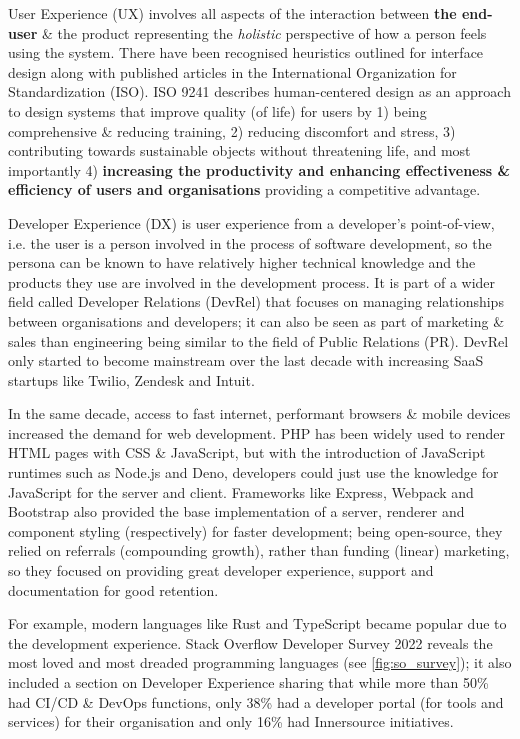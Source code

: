 User Experience (UX) involves all aspects of the interaction between \textbf{the end-user} \& the product representing the \textit{holistic} perspective of how a person feels using the system. There have been recognised heuristics outlined for interface design along with published articles in the International Organization for Standardization (ISO). ISO 9241 describes human-centered design as an approach to design systems that improve quality (of life) for users by 1) being comprehensive \& reducing training, 2) reducing discomfort and stress, 3) contributing towards sustainable objects without threatening life, and most importantly 4) \textbf{increasing the productivity and enhancing effectiveness \& efficiency of users and organisations} providing a competitive advantage.

Developer Experience (DX) is user experience from a developer's point-of-view, i.e. the user is a person involved in the process of software development, so the persona can be known to have relatively higher technical knowledge and the products they use are involved in the development process. It is part of a wider field called Developer Relations (DevRel) that focuses on managing relationships between organisations and developers; it can also be seen as part of marketing \& sales than engineering being similar to the field of Public Relations (PR). DevRel only started to become mainstream over the last decade with increasing SaaS startups like Twilio, Zendesk and Intuit.

In the same decade, access to fast internet, performant browsers \& mobile devices increased the demand for web development. PHP has been widely used to render HTML pages with CSS \& JavaScript, but with the introduction of JavaScript runtimes such as Node.js and Deno, developers could just use the knowledge for JavaScript for the server and client. Frameworks like Express, Webpack and Bootstrap also provided the base implementation of a server, renderer and component styling (respectively) for faster development; being open-source, they relied on referrals (compounding growth), rather than funding (linear) marketing, so they focused on providing great developer experience, support and documentation for good retention.

For example, modern languages like Rust and TypeScript became popular due to the development experience. Stack Overflow Developer Survey 2022 reveals the most loved and most dreaded programming languages (see \autoref{fig:so_survey}); it also included a section on Developer Experience sharing that while more than 50\% had CI/CD \& DevOps functions, only 38\% had a developer portal (for tools and services) for their organisation and only 16\% had Innersource initiatives.

